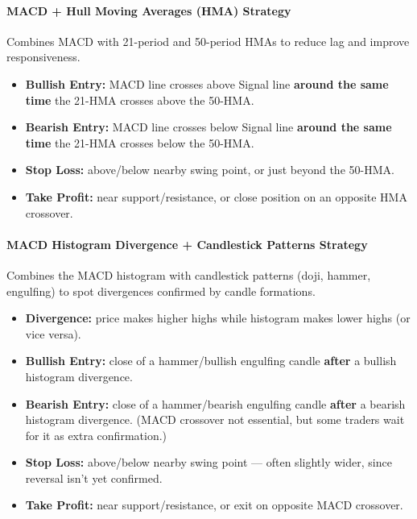 \documentclass[12pt,openany]{book}
\begin{document}
\paragraph{MACD + Hull Moving Averages (HMA) Strategy}

Combines MACD with 21-period and 50-period HMAs to reduce lag and improve responsiveness.

\begin{itemize}[leftmargin=*]
    \item \textbf{Bullish Entry:} MACD line crosses above Signal line \textbf{around the same time} the 21-HMA crosses above the 50-HMA.
    \item \textbf{Bearish Entry:} MACD line crosses below Signal line \textbf{around the same time} the 21-HMA crosses below the 50-HMA.
    \item \textbf{Stop Loss:} above/below nearby swing point, or just beyond the 50-HMA.
    \item \textbf{Take Profit:} near support/resistance, or close position on an opposite HMA crossover.
\end{itemize}

\paragraph{MACD Histogram Divergence + Candlestick Patterns Strategy}

Combines the MACD histogram with candlestick patterns (doji, hammer, engulfing) to spot divergences confirmed by candle formations.

\begin{itemize}[leftmargin=*]
    \item \textbf{Divergence:} price makes higher highs while histogram makes lower highs (or vice versa).
    \item \textbf{Bullish Entry:} close of a hammer/bullish engulfing candle \textbf{after} a bullish histogram divergence.
    \item \textbf{Bearish Entry:} close of a hammer/bearish engulfing candle \textbf{after} a bearish histogram divergence. (MACD crossover not essential, but some traders wait for it as extra confirmation.)
    \item \textbf{Stop Loss:} above/below nearby swing point --- often slightly wider, since reversal isn't yet confirmed.
    \item \textbf{Take Profit:} near support/resistance, or exit on opposite MACD crossover.
\end{itemize}
\end{document}
